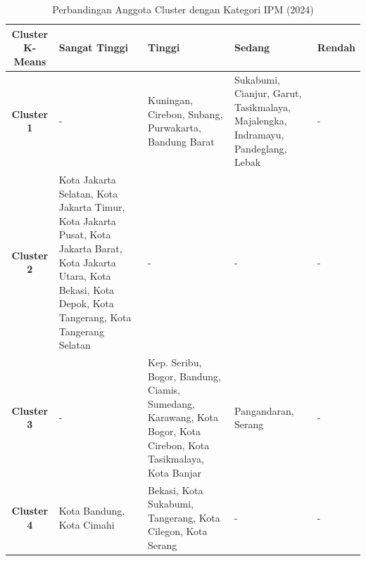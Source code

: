 \begin{table}[H]
\centering
\caption{Perbandingan Anggota Cluster dengan Kategori IPM (2024)} \label{tab:ipm_cross_2024}
\begin{tabular}{|c|p{2cm}|p{2cm}|p{2cm}|p{2cm}|}
\hline
\textbf{Cluster K-Means} & \textbf{Sangat Tinggi} & \textbf{Tinggi} & \textbf{Sedang} & \textbf{Rendah} \\ \hline
\textbf{Cluster 1} & - & Kuningan, Cirebon, Subang, Purwakarta, Bandung Barat & Sukabumi, Cianjur, Garut, Tasikmalaya, Majalengka, Indramayu, Pandeglang, Lebak & - \\ \hline
\textbf{Cluster 2} & Kota Jakarta Selatan, Kota Jakarta Timur, Kota Jakarta Pusat, Kota Jakarta Barat, Kota Jakarta Utara, Kota Bekasi, Kota Depok, Kota Tangerang, Kota Tangerang Selatan & - & - & - \\ \hline
\textbf{Cluster 3} & - & Kep. Seribu, Bogor, Bandung, Ciamis, Sumedang, Karawang, Kota Bogor, Kota Cirebon, Kota Tasikmalaya, Kota Banjar & Pangandaran, Serang & - \\ \hline
\textbf{Cluster 4} & Kota Bandung, Kota Cimahi & Bekasi, Kota Sukabumi, Tangerang, Kota Cilegon, Kota Serang & - & - \\ \hline
\end{tabular}
\end{table}